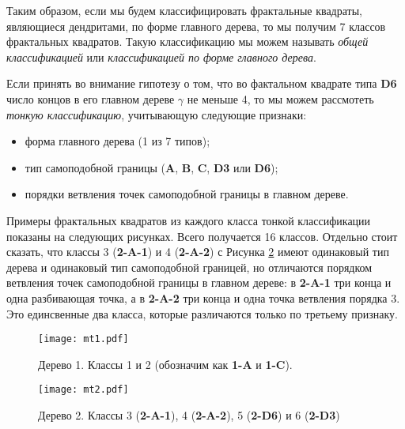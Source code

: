 Таким образом, если мы будем классифицировать фрактальные квадраты, являющиеся дендритами, по форме главного дерева, то мы получим 7 классов фрактальных квадратов.
Такую классификацию мы можем называть {\em общей классификацией} или {\em классификацией по форме главного дерева}.

Если принять во внимание гипотезу о том, что во фактальном квадрате типа {\bf D6} число концов в его главном дереве $\gamma$ не меньше 4, то мы можем рассмотеть {\em тонкую классификацию}, учитывающую следующие признаки:
\begin{itemize}[nolistsep]
	\item[1.] форма главного дерева (1 из 7 типов);
	\item[2.] тип самоподобной границы ({\bf A}, {\bf B}, {\bf C}, {\bf D3} или {\bf D6});
	\item[3.] порядки ветвления точек самоподобной границы в главном дереве.
\end{itemize}

Примеры фрактальных квадратов из каждого класса тонкой классификации показаны на следующих рисунках.
Всего получается 16 классов.
Отдельно стоит сказать, что классы 3 ({\bf 2-A-1}) и 4 ({\bf 2-A-2}) с Рисунка \ref{fig:tree2} имеют одинаковый тип дерева и одинаковый тип самоподобной границей, но отличаются порядком ветвления точек самоподобной границы в главном дереве: в {\bf 2-A-1} три конца и одна разбивающая точка, а в {\bf 2-A-2} три конца и одна точка ветвления порядка 3.
Это единсвенные два класса, которые различаются только по третьему признаку.


\begin{figure}[H]
    \centering
    \texttt{[image: mt1.pdf]}
    \vspace{0.5cm}
    \vfill
    \hfill
    \caption{Дерево 1. Классы 1 и 2 (обозначим как \textbf{1-A} и \textbf{1-C}). }
    \label{fig:tree1}
\end{figure}

\begin{figure}[H]
    \centering
    \texttt{[image: mt2.pdf]}
    \vspace{0.5cm}\vfill
    \hfill
    \vspace{0.3cm}\vfill
    \hfill
    \caption{Дерево 2. Классы 3 ({\bf 2-A-1}), 4 ({\bf 2-A-2}), 5 ({\bf 2-D6}) и 6 ({\bf 2-D3})}
    \label{fig:tree2}
\end{figure}

